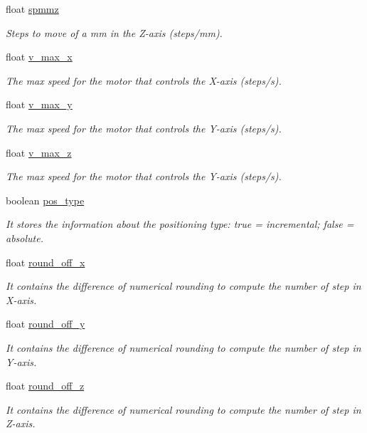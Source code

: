 \begin{DoxyCompactItemize}
float \hyperlink{class_c_n_c___router_a18bda26476d6fbe11fc6bb6ec69171ea}{spmmz}
\begin{DoxyCompactList}\small\item\em Steps to move of a mm in the Z-\/axis (steps/mm). \end{DoxyCompactList}\item 
float \hyperlink{class_c_n_c___router_afa08612e63f2cc3d3283fa06679b5d7a}{v\+\_\+max\+\_\+x}
\begin{DoxyCompactList}\small\item\em The max speed for the motor that controls the X-\/axis (steps/s). \end{DoxyCompactList}\item 
float \hyperlink{class_c_n_c___router_a5e3fe2fd85292f3f5d9d2e13078b6a42}{v\+\_\+max\+\_\+y}
\begin{DoxyCompactList}\small\item\em The max speed for the motor that controls the Y-\/axis (steps/s). \end{DoxyCompactList}\item 
float \hyperlink{class_c_n_c___router_a9e6e9d29184c011ec64e9648995af4cb}{v\+\_\+max\+\_\+z}
\begin{DoxyCompactList}\small\item\em The max speed for the motor that controls the Y-\/axis (steps/s). \end{DoxyCompactList}\item 
boolean \hyperlink{class_c_n_c___router_afd35356064c7667cbdf21c44a7dd7cf5}{pos\+\_\+type}
\begin{DoxyCompactList}\small\item\em It stores the information about the positioning type\+: true = incremental; false = absolute. \end{DoxyCompactList}\item 
float \hyperlink{class_c_n_c___router_a940f5722a449f52bc29e437dfd6a1909}{round\+\_\+off\+\_\+x}
\begin{DoxyCompactList}\small\item\em It contains the difference of numerical rounding to compute the number of step in X-\/axis. \end{DoxyCompactList}\item 
float \hyperlink{class_c_n_c___router_a2ac9fcca41eb0791859761fd9a3fd613}{round\+\_\+off\+\_\+y}
\begin{DoxyCompactList}\small\item\em It contains the difference of numerical rounding to compute the number of step in Y-\/axis. \end{DoxyCompactList}\item 
float \hyperlink{class_c_n_c___router_a777a55ac1be584ef2a827d412bf9ae40}{round\+\_\+off\+\_\+z}
\begin{DoxyCompactList}\small\item\em It contains the difference of numerical rounding to compute the number of step in Z-\/axis. \end{DoxyCompactList}\end{DoxyCompactItemize}


